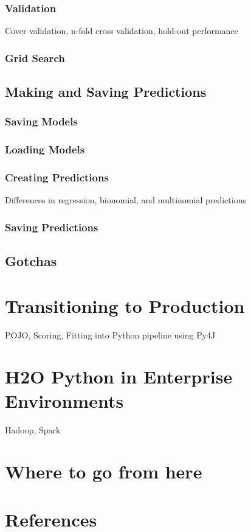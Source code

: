 \subsubsection{Validation}
Cover validation, n-fold cross validation, hold-out performance
\subsubsection{Grid Search}

\subsection{Making and Saving Predictions}
\subsubsection{Saving Models}
\subsubsection{Loading Models}
\subsubsection{Creating Predictions}
Differences in regression, bionomial, and multinomial predictions
\subsubsection{Saving Predictions}

\subsection{Gotchas}

\section{Transitioning to Production}
POJO, Scoring, Fitting into Python pipeline using Py4J


\section{H2O Python in Enterprise Environments}
Hadoop, Spark

\section{Where to go from here}


\newpage
\section{References}








\enddocument